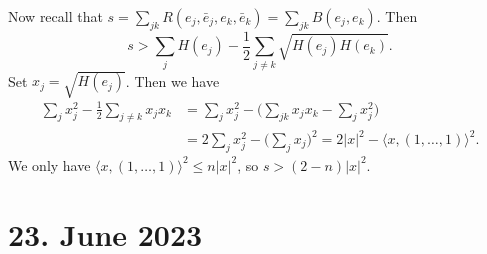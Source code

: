 \documentclass[11pt]{article}
\theoremstyle{definition}
\def\<{\langle}
\def\>{\rangle}
\begin{document}
Now recall that
$s = \sum_{jk} R(e_j, \bar e_j, e_k, \bar e_k) = \sum_{jk} B(e_j, e_k)$.
Then
$$
s > \sum_j H(e_j) - \frac12 \sum_{j \not= k} \sqrt{H(e_j) H(e_k)}.
$$
Set $x_j = \sqrt{H(e_j)}$.
Then we have
\begin{align*}
\sum_j x_j^2 - \frac12 \sum_{j \not= k} x_j x_k
&= \sum_j x_j^2 - \biggl(\sum_{jk} x_j x_k - \sum_{j} x_j^2\biggr)
\\
&= 2 \sum_j x_j^2 - \biggl(\sum_j x_j \biggr)^2
= 2 |x|^2 - \<x, (1, \ldots, 1) \>^2.
\end{align*}
We only have $\<x, (1, \ldots, 1) \>^2 \leq n |x|^2$, so
$s > (2-n) |x|^2$.

\section{23. June 2023}
\end{document}
